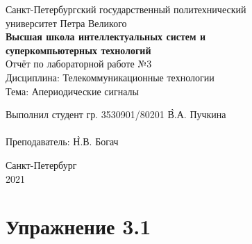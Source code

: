 \documentclass[a4paper, 14pt]{extarticle}
\begin{document}
    \begin{center}
        \begin{center}
            \hfill \break
            \normalsize{Санкт-Петербургский государственный политехнический}\\
            \normalsize{университет Петра Великого}\\
            \hfill \break
            \normalsize{\textbf{Высшая школа интеллектуальных систем и}}\\
            \normalsize{\textbf{суперкомпьютерных технологий}}\\
            \hfill \break
            \hfill \break
            \hfill \break
            \hfill \break
            \hfill \break
            \normalsize{Отчёт по лабораторной работе №3}\\
            \normalsize{Дисциплина: Телекоммуникационные технологии}\\
            \normalsize{Тема: Апериодические сигналы}\\
        \end{center}
        \hfill \break
        \hfill \break
        \hfill \break
        \hfill \break
        \hfill \break
        \hfill \break
        \hfill \break
        \hfill \break
        \hfill \break
        \hfill \break
        \begin{tabbing}
            Выполнил студент гр. 3530901/80201 \`В.А. Пучкина\\
            \\
            Преподаватель: \`Н.В. Богач\\
        \end{tabbing}
        \hfill \break
        \hfill \break
        \hfill \break
        \hfill \break
        \begin{center}
            Санкт-Петербург\\
            2021
        \end{center}
        \thispagestyle{empty}
    \end{center}

    \newpage
    \tableofcontents

    \newpage
    \listoffigures

    \newpage
    \lstlistoflistings

    \newpage
    \section{Упражнение 3.1}
    \label{sec:task1}
\end{document}
